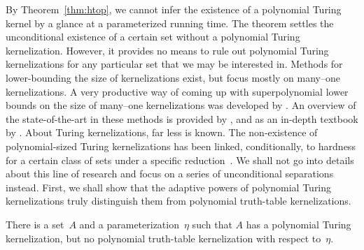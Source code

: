 By Theorem~\ref{thm:htop}, we cannot infer the existence of a polynomial Turing kernel by a glance at a parameterized running time.
The theorem settles the unconditional existence of a certain set without a polynomial Turing kernelization.
However, it provides no means to rule out polynomial Turing kernelizations for any particular set that we may be interested in.
Methods for lower-bounding the size of kernelizations exist, but focus mostly on many--one kernelizations.
A very productive way of coming up with superpolynomial lower bounds on the size of many--one kernelizations was developed by \textcite{bodlaender2009problems}.
An overview of the state-of-the-art in these methods is provided by \textcite{kratsch2014recent}, and as an in-depth textbook by \textcite{fomin2019kernelization}.
About Turing kernelizations, far less is known.
The non-existence of polynomial-sized Turing kernelizations has been linked, conditionally, to hardness for a certain class of sets under a specific reduction~\parencite{hermelin2015completeness}.
We shall not go into details about this line of research and focus on a series of unconditional separations instead.
First, we shall show that the adaptive powers of polynomial Turing kernelizations truly distinguish them from polynomial truth-table kernelizations.
\begin{theorem}
\label{thm:ht}%
  There is a set~$A$ and a parameterization~$\eta$ such that $A$ has a polynomial Turing kernelization, but no polynomial truth-table kernelization with respect to~$\eta$.
\end{theorem}
